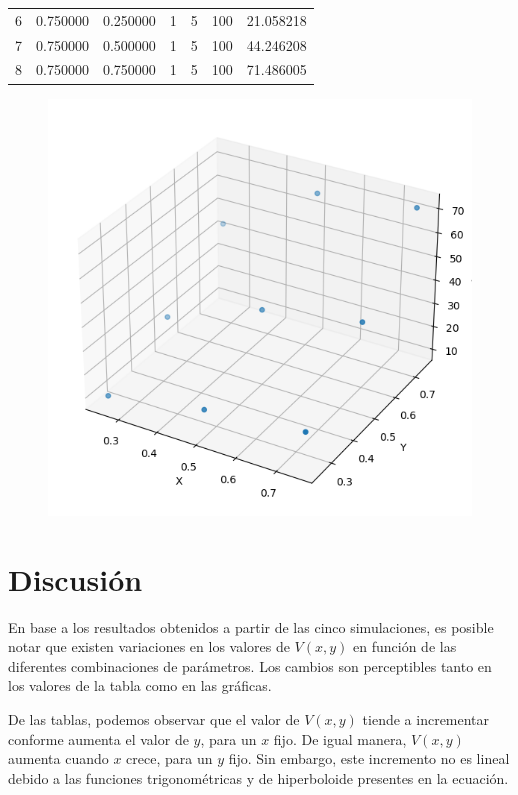 \begin{itemize}
\begin{center}
\begin{tabular}{lcccccc}
           6 & 0.750000 & 0.250000 & 1 & 5 & 100 & 21.058218 \\
           7 & 0.750000 & 0.500000 & 1 & 5 & 100 & 44.246208 \\
           8 & 0.750000 & 0.750000 & 1 & 5 & 100 & 71.486005 \\
           \end{tabular}
    \end{center}
    \begin{figure}[H]
        \centering
        \includegraphics[scale=0.5]{Problemas/5.png}
    \end{figure}
\end{itemize}

\section{Discusión}

En base a los resultados obtenidos a partir de las cinco simulaciones, es posible notar que existen variaciones en los valores de $V(x,y)$ en función de las diferentes combinaciones de parámetros. Los cambios son perceptibles tanto en los valores de la tabla como en las gráficas.\bigbreak

De las tablas, podemos observar que el valor de $V(x, y)$ tiende a incrementar conforme aumenta el valor de $y$, para un $x$ fijo. De igual manera, $V(x, y)$ aumenta cuando $x$ crece, para un $y$ fijo. Sin embargo, este incremento no es lineal debido a las funciones trigonométricas y de hiperboloide presentes en la ecuación.\bigbreak

